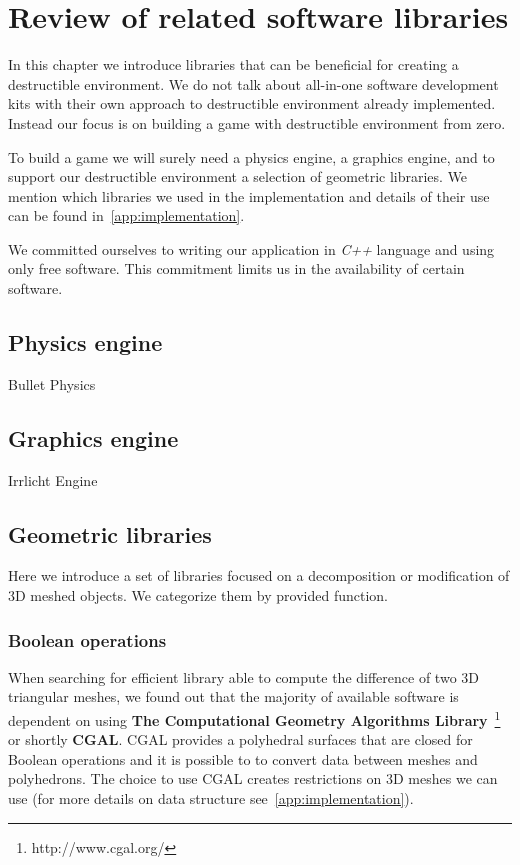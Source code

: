 \chapter{Review of related software libraries}
\label{chapt:technology}
In this chapter we introduce libraries that can be beneficial for creating a destructible environment. We do not talk about all-in-one software development kits with their own approach to destructible environment already implemented. Instead our focus is on building a game with destructible environment from zero.  

To build a game we will surely need a physics engine, a graphics engine, and to support our destructible environment a selection of geometric libraries. We mention which libraries we used in the implementation and details of their use can be found in~\cref{app:implementation}.

We committed ourselves to writing our application in \emph{C++} language and using only free software. This commitment limits us in the  availability of certain software. 

\section{Physics engine}
Bullet Physics


\section{Graphics engine}
Irrlicht Engine

\section{Geometric libraries}
Here we introduce a set of libraries focused on a decomposition or modification of 3D meshed objects. We categorize them by provided function.

\subsection{Boolean operations}
When searching for efficient library able to compute the difference of two 3D triangular meshes, we found out that the majority of available software is dependent on using \textbf{The Computational Geometry Algorithms Library}~\footnote{http://www.cgal.org/} or shortly \textbf{CGAL}. CGAL provides a polyhedral surfaces that are closed for Boolean operations and it is possible to to convert data between meshes and polyhedrons. The choice to use CGAL creates restrictions on 3D meshes we can use (for more details on data structure see~\cref{app:implementation}).

